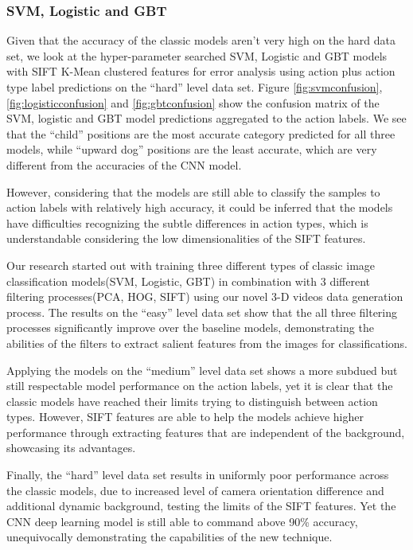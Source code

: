 \documentclass[
	a4paper, %
	10pt, %
	unnumberedsections, %
	twoside, %
]{t0004}
\begin{document}
\subsubsection{SVM, Logistic and GBT} Given that the accuracy of the classic models aren't very high on the hard data set, we look at the hyper-parameter searched SVM, Logistic and GBT models with SIFT K-Mean clustered features for error analysis using action plus action type label predictions on the ``hard'' level data set. Figure \ref{fig:svmconfusion}, \ref{fig:logisticconfusion} and \ref{fig:gbtconfusion} show the confusion matrix of the SVM, logistic and GBT model predictions aggregated to the action labels. We see that the ``child'' positions are the most accurate category predicted for all three models, while ``upward dog'' positions are the least accurate, which are very different from the accuracies of the CNN model.

However, considering that the models are still able to classify the samples to action labels with relatively high accuracy, it could be inferred that the models have difficulties recognizing the subtle differences in action types, which is understandable considering the low dimensionalities of the SIFT features.

Our research started out with training three different types of classic image classification models(SVM, Logistic, GBT) in combination with 3 different filtering processes(PCA, HOG, SIFT) using our novel 3-D videos data generation process. The results on the ``easy'' level data set show that the all three filtering processes significantly improve over the baseline models, demonstrating the abilities of the filters to extract salient features from the images for classifications.

Applying the models on the ``medium'' level data set shows a more subdued but still respectable model performance on the action labels, yet it is clear that the classic models have reached their limits trying to distinguish between action types. However, SIFT features are able to help the models achieve higher performance through extracting features that are independent of the background, showcasing its advantages.

Finally, the ``hard'' level data set results in uniformly poor performance across the classic models, due to increased level of camera orientation difference and additional dynamic background, testing the limits of the SIFT features. Yet the CNN deep learning model is still able to command above 90\% accuracy, unequivocally demonstrating the capabilities of the new technique.
\end{document}
